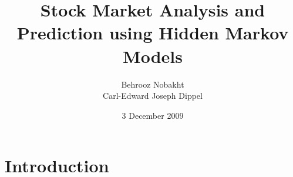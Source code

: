 \documentclass{acm_proc_article-sp}
\begin{document}
\title{Stock Market Analysis and Prediction using Hidden Markov Models}

\author{
  \alignauthor Behrooz Nobakht \\ 
  \alignauthor Carl-Edward Joseph Dippel\\ 
}

\date{3 December 2009}

\maketitle
\begin{abstract}
\end{abstract}

\section{Introduction}
\end{document}
